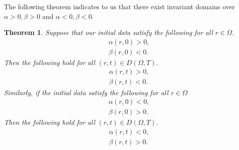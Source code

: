 \documentclass[11pt]{article}
\newtheorem{thm}{Theorem}[section]
\begin{document}
The following theorem indicates to us that there exist invariant domains over $\alpha>0,\beta>0$ and $\alpha<0,\beta<0$. 

\begin{thm}
	Suppose that our initial data satisfy the following for all $r \in \Omega$. 
	\begin{align}
		&\alpha(r,0) > 0, 
		\\
		&\beta(r,0) < 0.
	\end{align} 
	Then the following hold for all $(r,t) \in D(\Omega,T)$. 
	\begin{align}
		&\alpha(r,t) > 0, 
		\\
		&\beta(r,t) < 0. 
	\end{align} 
	Similarly, if the initial data satisfy the following for all $r \in \Omega$
	\begin{align}
		&\alpha(r,0) < 0, 
		\\
		&\beta(r,0) > 0.
	\end{align} 
	Then the following hold for all $(r,t) \in D(\Omega,T)$.  
	\begin{align}
		&\alpha(r,t) < 0,
		\\
		&\beta(r,t) > 0. 
	\end{align} 
\end{thm} 
\end{document}
